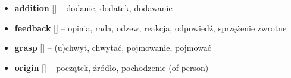 \documentclass[a4paper,12pt]{book}
\begin{document}
	\begin{itemize}
\item \textbf{addition} [] – dodanie, dodatek, dodawanie
\item \textbf{feedback} [] – opinia, rada, odzew, reakcja, odpowiedź, sprzężenie zwrotne
\item \textbf{grasp} [] – (u)chwyt, chwytać, pojmowanie, pojmować
\item \textbf{origin} [] – początek, źródło, pochodzenie (of person)
	\end{itemize}
\end{document}
